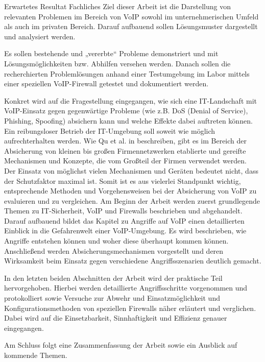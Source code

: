 \begin{section}{Erwartetes Resultat}
Fachliches Ziel dieser Arbeit ist die Darstellung von relevanten Problemen im Bereich von VoIP sowohl im unternehmerischen Umfeld als auch im privaten Bereich. Darauf aufbauend sollen Lösungsmuster dargestellt und analysiert werden. 

Es sollen bestehende und „vererbte“ Probleme demonstriert und mit Lösungsmöglichkeiten bzw. Abhilfen versehen werden. 
Danach sollen die recherchierten Problemlösungen anhand einer Testumgebung im Labor mittels einer speziellen VoIP-Firewall getestet und dokumentiert werden.

Konkret wird auf die Fragestellung eingegangen, wie sich eine IT-Landschaft mit VoIP-Einsatz gegen gegenwärtige Probleme (wie z.B. DoS (Denial of Service), Phishing, Spoofing) absichern kann und welche Effekte dabei auftreten können. Ein reibungsloser Betrieb der IT-Umgebung soll soweit wie möglich aufrechterhalten werden.
Wie Qu et al. in \cite{Qu:2009:desactv}  beschreiben, gibt es im Bereich der Absicherung von kleinen bis großen Firmennetzwerken  etablierte und gereifte Mechanismen und Konzepte, die vom Großteil der Firmen verwendet werden. 
\\
Der Einsatz von möglichst vielen Mechanismen und Geräten bedeutet nicht, dass der Schutzfaktor maximal ist. Somit ist es aus vielerlei Standpunkt wichtig, entsprechende Methoden und Vorgehensweisen bei der Absicherung von VoIP zu evaluieren und zu vergleichen.
Am Beginn der Arbeit werden zuerst grundlegende Themen zu IT-Sicherheit, VoIP und Firewalls beschrieben und abgehandelt. Darauf aufbauend bildet das Kapitel zu Angriffe auf VoIP einen detaillierten Einblick in die Gefahrenwelt einer VoIP-Umgebung. Es wird beschrieben, wie Angriffe entstehen können und woher diese überhaupt kommen können. Anschließend werden  Absicherungsmechanismen vorgestellt und deren Wirksamkeit beim Einsatz gegen verschiedene Angriffsszenarien deutlich gemacht.

In den letzten beiden Abschnitten der Arbeit wird der praktische Teil hervorgehoben. Hierbei werden detaillierte Angriffsschritte vorgenommen und protokolliert sowie Versuche zur Abwehr und Einsatzmöglichkeit und Konfigurationsmethoden von speziellen Firewalls näher erläutert und verglichen. Dabei wird auf die Einsetzbarkeit, Sinnhaftigkeit und Effizienz genauer eingegangen.

Am Schluss folgt eine Zusammenfassung der Arbeit sowie ein Ausblick auf kommende Themen.
\end{section}
\pagebreak

